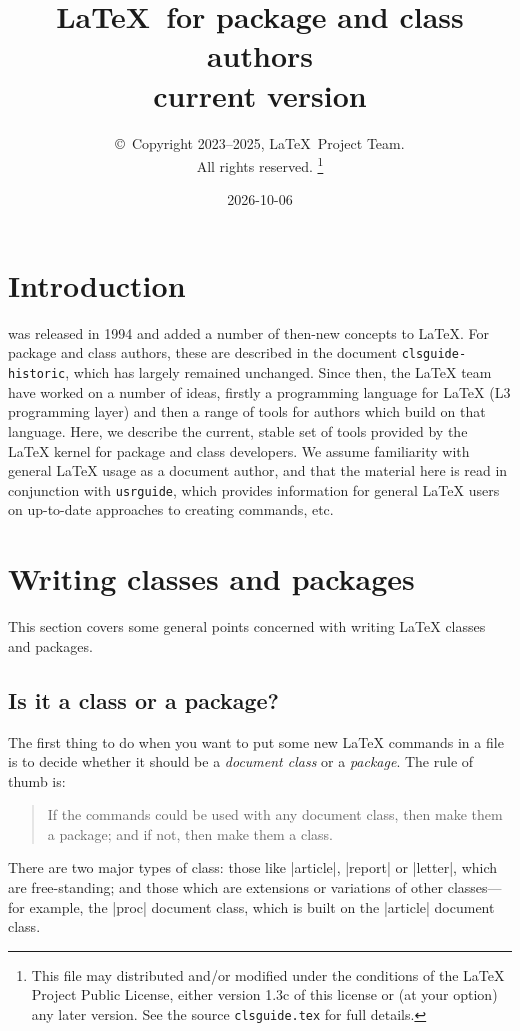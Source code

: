 \documentclass{ltxguide}
\title{\LaTeX\ for package and class authors\\current version}
\author{\copyright~Copyright 2023--2025, \LaTeX\ Project Team.\\
   All rights reserved.%
   \footnote{This file may distributed and/or modified under the
     conditions of the \LaTeX{} Project Public License, either version 1.3c
     of this license or (at your option) any later version. See the source
    \texttt{clsguide.tex} for full details.}%
}
\date{2026-10-06}
\begin{document}
\maketitle

\tableofcontents

\section{Introduction}

\LaTeXe{} was released in 1994 and added a number of then-new concepts to
\LaTeX{}. For package and class authors, these are described in the document
\texttt{clsguide-historic}, which has largely remained unchanged. Since then,
the \LaTeX{} team have worked on a number of ideas, firstly a programming
language for \LaTeX{} (L3 programming layer) and then a range of tools for
authors which build on that language. Here, we describe the current, stable set
of tools provided by the \LaTeX{} kernel for package and class developers. We
assume familiarity with general \LaTeX{} usage as a document author, and that
the material here is read in conjunction with \texttt{usrguide}, which provides
information for general \LaTeX{} users on up-to-date approaches to creating
commands, etc.

\section{Writing classes and packages}
\label{sec:writing}

This section covers some general points concerned with writing
\LaTeX{} classes and packages.

\subsection{Is it a class or a package?}
\label{sec:classorpkg}

The first thing to do when you want to put some new \LaTeX{} commands
in a file is to decide whether it should be a \emph{document class} or a
\emph{package}.  The rule of thumb is:
\begin{quote}
  If the commands could be used with any document class, then make
  them a package; and if not, then make them a class.
\end{quote}

There are two major types of class: those like |article|, |report| or
|letter|, which are free-standing; and those which are extensions or
variations of other classes---for example, the |proc| document class,
which is built on the |article| document class.
\end{document}
